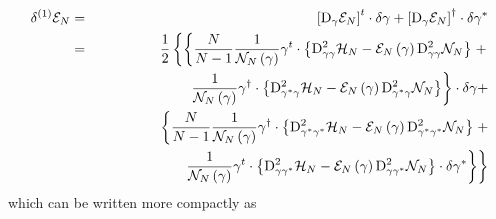 \documentclass[aps,preprint]{revtex4}
\begin{document}
\begin{eqnarray}
\delta ^{\left( 1\right) }\mathcal{E}_{N} &=&\left[ \mathrm{D}_{\gamma }%
\mathcal{E}_{N}\right] ^{t}\cdot \delta \mathbf{\gamma }+\left[ \mathrm{D}%
_{\gamma }\mathcal{E}_{N}\right] ^{\dagger }\cdot \delta \mathbf{\gamma }%
^{\ast }  \nonumber \\
&=&\frac{1}{2}\left\{ \left\{ \frac{N}{N-1}\frac{1}{\mathcal{N}_{N}\left( 
\mathbf{\gamma }\right) }\mathbf{\gamma }^{t}\cdot \left\{ \mathrm{D}%
_{\gamma \gamma }^{2}\mathcal{H}_{N}-\mathcal{E}_{N}\left( \mathbf{\gamma }%
\right) \mathrm{D}_{\gamma \gamma }^{2}\mathcal{N}_{N}\right\} \right.
+\right.  \nonumber \\
&&\qquad \qquad \qquad \left. \frac{1}{\mathcal{N}_{N}\left( \mathbf{\gamma }%
\right) }\mathbf{\gamma }^{\dagger }\cdot \left\{ \mathrm{D}_{\gamma ^{\ast
}\gamma }^{2}\mathcal{H}_{N}-\mathcal{E}_{N}\left( \mathbf{\gamma }\right) 
\mathrm{D}_{\gamma ^{\ast }\gamma }^{2}\mathcal{N}_{N}\right\} \right\}
\cdot \delta \mathbf{\gamma +}  \nonumber \\
&&\qquad \left\{ \frac{N}{N-1}\frac{1}{\mathcal{N}_{N}\left( \mathbf{\gamma }%
\right) }\mathbf{\gamma }^{\dagger }\cdot \left\{ \mathrm{D}_{\gamma ^{\ast
}\gamma ^{\ast }}^{2}\mathcal{H}_{N}-\mathcal{E}_{N}\left( \mathbf{\gamma }%
\right) \mathrm{D}_{\gamma ^{\ast }\gamma ^{\ast }}^{2}\mathcal{N}%
_{N}\right\} \right. +  \nonumber \\
&&\qquad \qquad \qquad \left. \left. \frac{1}{\mathcal{N}_{N}\left( \mathbf{%
\gamma }\right) }\mathbf{\gamma }^{t}\cdot \left\{ \mathrm{D}_{\gamma \gamma
^{\ast }}^{2}\mathcal{H}_{N}-\mathcal{E}_{N}\left( \mathbf{\gamma }\right) 
\mathrm{D}_{\gamma \gamma ^{\ast }}^{2}\mathcal{N}_{N}\right\} \cdot \delta 
\mathbf{\gamma }^{\ast }\right\} \right\}
\end{eqnarray}%
which can be written more compactly as 
\end{document}
